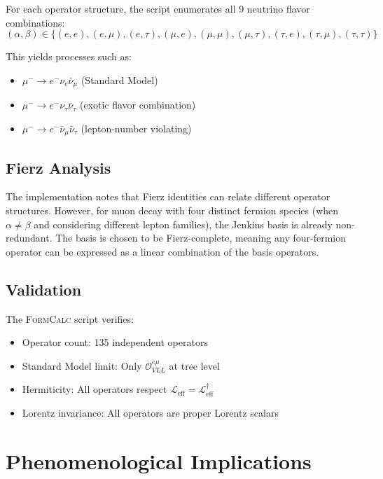 \documentclass[11pt,a4paper]{article}
\newcommand{\formcalc}{\textsc{FormCalc}}
\begin{document}
For each operator structure, the script enumerates all 9 neutrino flavor combinations:
\begin{equation}
(\alpha, \beta) \in \{(e,e), (e,\mu), (e,\tau), (\mu,e), (\mu,\mu), (\mu,\tau), (\tau,e), (\tau,\mu), (\tau,\tau)\}
\end{equation}

This yields processes such as:
\begin{itemize}
\item $\mu^- \to e^- \nu_e \bar{\nu}_\mu$ (Standard Model)
\item $\mu^- \to e^- \nu_\tau \bar{\nu}_\tau$ (exotic flavor combination)
\item $\mu^- \to e^- \bar{\nu}_\mu \bar{\nu}_\tau$ (lepton-number violating)
\end{itemize}

\subsection{Fierz Analysis}

The implementation notes that Fierz identities can relate different operator structures. However, for muon decay with four distinct fermion species (when $\alpha \neq \beta$ and considering different lepton families), the Jenkins basis is already non-redundant. The basis is chosen to be Fierz-complete, meaning any four-fermion operator can be expressed as a linear combination of the basis operators.

\subsection{Validation}

The \formcalc{} script verifies:
\begin{itemize}
\item Operator count: 135 independent operators
\item Standard Model limit: Only $\mathcal{O}_{VLL}^{e\mu}$ at tree level
\item Hermiticity: All operators respect $\mathcal{L}_{\text{eff}} = \mathcal{L}_{\text{eff}}^\dagger$
\item Lorentz invariance: All operators are proper Lorentz scalars
\end{itemize}

\section{Phenomenological Implications}
\end{document}
